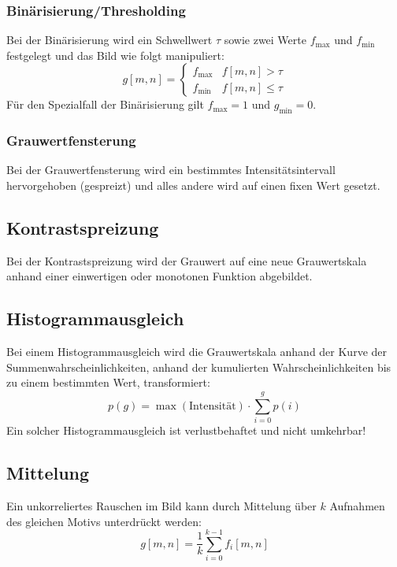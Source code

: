 			\subsubsection{Binärisierung/Thresholding}
				Bei der Binärisierung wird ein Schwellwert \(\tau\) sowie zwei Werte \(f_\text{max}\) und \(f_\text{min}\) festgelegt und das Bild wie folgt manipuliert:
				\begin{equation*}
					g[m, n] =
					\begin{cases}
						f_\text{max} & f[m, n] > \tau    \\
						f_\text{min} & f[m, n] \leq \tau
					\end{cases}
				\end{equation*}
				Für den Spezialfall der Binärisierung gilt \( f_\text{max} = 1 \) und \( g_\text{min} = 0 \).

			\subsubsection{Grauwertfensterung}
				Bei der Grauwertfensterung wird ein bestimmtes Intensitätsintervall hervorgehoben (gespreizt) und alles andere wird auf einen fixen Wert gesetzt.

		\subsection{Kontrastspreizung}
			Bei der Kontrastspreizung wird der Grauwert auf eine neue Grauwertskala anhand einer einwertigen oder monotonen Funktion abgebildet.

		\subsection{Histogrammausgleich}
			Bei einem Histogrammausgleich wird die Grauwertskala anhand der Kurve der Summenwahrscheinlichkeiten, \dh anhand der kumulierten Wahrscheinlichkeiten bis zu einem bestimmten Wert, transformiert:
			\begin{equation*}
				p(g) = \max(\text{Intensität}) \cdot \sum_{i = 0}^{g} p(i)
			\end{equation*}
			Ein solcher Histogrammausgleich ist verlustbehaftet und nicht umkehrbar!

		\subsection{Mittelung}
			Ein unkorreliertes Rauschen im Bild kann durch Mittelung über \(k\) Aufnahmen des gleichen Motivs unterdrückt werden:
			\begin{equation*}
				g[m, n] = \frac{1}{k} \sum_{i = 0}^{k - 1} f_i[m, n]
			\end{equation*}

